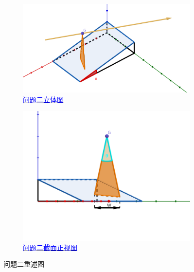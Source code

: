 \begin{figure}[htbp]
    \centering
    \begin{subfigure}[b]{0.45\textwidth}
      \centering
      \includegraphics[scale=0.18]{res/img/问题二重述图.png}
      \caption{\href{https://www.geogebra.org/m/pwzyn5ba}{\textcolor{blue}{问题二立体图}}}
      \label{fig:问题二立体图}
    \end{subfigure}
    \hfill
    \begin{subfigure}[b]{0.45\textwidth}
      \centering
      \includegraphics[scale=0.18]{res/img/问题二重述图_截面图.png}
      \caption{\href{https://www.geogebra.org/m/g2rwmqvx}{\textcolor{blue}{问题二截面正视图}}}
      \label{fig:问题二截面正视图}
    \end{subfigure}
    \caption{问题二重述图}
    \label{fig:问题二重述图}
\end{figure}


